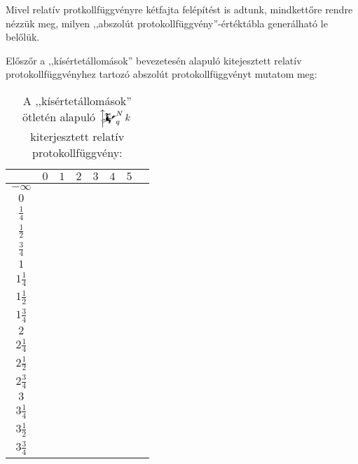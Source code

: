 \documentclass{article}
\newcommand{\blk}{\cellcolor{darkgray}}
\newcommand{\red}{\cellcolor{red!33}}
\newcommand{\grn}{\cellcolor{green!33}}
\newcommand{\ylw}{\cellcolor{yellow}}
\newcommand{\nothing}{\text{\raisebox{0.4em}{\rotatebox{180}{$\curvearrowleft$}}}}%
\newcommand{\just}[1]{\boxed{#1}}%
\newcommand{\incl}{\mathbf{incl}}
\newcommand{\excl}{\mathbf{excl}}
\newcommand{\mainfunext}[3]{\left\uparrow\!\!\!\mathwitch*_{#2}^{#1}#3\right.}
\begin{document}
	\setlength{\extrarowheight}{4px}


	Mivel relatív protkollfüggvényre kétfajta felépítést is adtunk, mindkettőre rendre nézzük meg, milyen ,,abszolút protokollfüggvény''-értéktábla generálható le belőlük.

	Előszőr a ,,kísértetállomások'' bevezetesén alapuló kitejesztett relatív protokollfüggvényhez tartozó abszolút protokollfüggvényt mutatom meg:

	\begin{table}[H]
		\caption*{A ,,kísértetállomások'' ötletén alapuló $\mainfunext Nqk$ kiterjesztett relatív protokollfüggvény:}
		\centering
		\begin{tabular}{c||c|c|c|c|c|c|c|}
				&	$0$		&	$1$		&	$2$		&	$3$		&	$4$		&	$5$		\\\hline\hline
		$-\infty$	&	\nothing	&	\nothing	&	\nothing	&	\nothing	&	\nothing	&	\nothing	\\\hline
			$0$	&	\nothing	&	\nothing	&	\nothing	&	\nothing	&	\nothing	&	\grn\just\incl	\\\hline
		$\frac14$	&	\ylw\nothing	&	\ylw\nothing	&	\ylw\nothing	&	\ylw\nothing	&	\ylw\nothing	&	\ylw\nothing	\\\hline
		$\frac12$	&	\red\just\excl	&	\nothing	&	\nothing	&	\nothing	&	\nothing	&	\grn\just\incl	\\\hline
		$\frac34$	&	\ylw\nothing	&	\ylw\nothing	&	\ylw\nothing	&	\ylw\nothing	&	\ylw\nothing	&	\ylw\nothing	\\\hline
			$1$	&	\red\just\excl	&	\nothing	&	\nothing	&	\nothing	&	\grn\just\incl	&	\blk		\\\hline
		$1\frac14$	&	\ylw\nothing	&	\ylw\nothing	&	\ylw\nothing	&	\ylw\nothing	&	\ylw\nothing	&	\ylw		\\\hline
		$1\frac12$	&	\blk		&	\red\just\excl	&	\nothing	&	\nothing	&	\grn\just\incl	&	\blk		\\\hline
		$1\frac34$	&	\ylw		&	\ylw\nothing	&	\ylw\nothing	&	\ylw\nothing	&	\ylw\nothing	&	\ylw		\\\hline
			$2$	&	\blk		&	\red\just\excl	&	\nothing	&	\grn\just\incl	&	\blk		&	\blk		\\\hline
		$2\frac14$	&	\ylw		&	\ylw\nothing	&	\ylw\nothing	&	\ylw\nothing	&	\ylw		&	\ylw		\\\hline
		$2\frac12$	&	\blk		&	\blk		&	\red\just\excl	&	\grn\just\incl	&	\blk		&	\blk		\\\hline
		$2\frac34$	&	\ylw		&	\ylw		&	\ylw\nothing	&	\ylw\nothing	&	\ylw		&	\ylw		\\\hline
			$3$	&	\blk		&	\blk		&	\blk		&	\blk		&	\blk		&	\blk		\\\hline
		$3\frac14$	&	\ylw		&	\ylw		&	\ylw		&	\ylw		&	\ylw		&	\ylw		\\\hline
		$3\frac12$	&	\blk		&	\blk		&	\blk		&	\blk		&	\blk		&	\blk		\\\hline
		$3\frac34$	&	\ylw		&	\ylw		&	\ylw		&	\ylw		&	\ylw		&	\ylw		\\\hline
		\end{tabular}
	\end{table}
\end{document}
